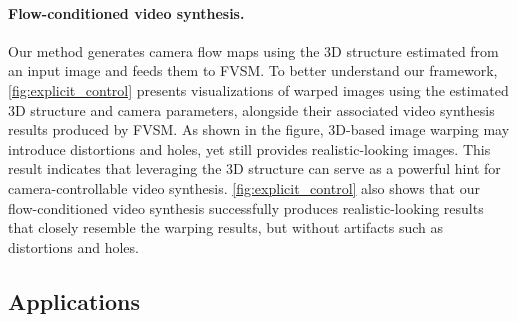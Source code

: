 \begin{table}[!t]
\centering
{}
\vspace{-3mm}
\caption{
Ablation study of our main components with the evaluation of video synthesis quality using the Pexels-random dataset.
}
\vspace{-1mm}
\label{table:ablation_object}
\end{table}


\vspace{-3.5mm}
\paragraph{Flow-conditioned video synthesis.}
Our method generates camera flow maps using the 3D structure estimated from an input image and feeds them to FVSM. To better understand our framework, \cref{fig:explicit_control} presents visualizations of warped images using the estimated 3D structure and camera parameters, alongside their associated video synthesis results produced by FVSM.
As shown in the figure, 3D-based image warping may introduce distortions and holes, yet still provides realistic-looking images. This result indicates that leveraging the 3D structure can serve as a powerful hint for camera-controllable video synthesis. \cref{fig:explicit_control} also shows that our flow-conditioned video synthesis successfully produces realistic-looking results that closely resemble the warping results, but without artifacts such as distortions and holes.






\subsection{Applications}
\vspace{-1mm}
